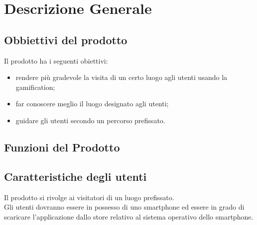 \section{Descrizione Generale}
\label{sec:DescrizioneGenerale}

	\subsection{Obbiettivi del prodotto}
	\label{sec:ObbiettiviDelProdotto}
		Il prodotto ha i seguenti obiettivi:
		\begin{itemize}
			\item rendere più gradevole la visita di un certo luogo agli utenti usando la gamification;
			\item far conoscere meglio il luogo designato agli utenti;
			\item guidare gli utenti secondo un percorso prefissato.
		\end{itemize}
	
	\subsection{Funzioni del Prodotto}
	\label{sub:Funzioni del Prodotto}
		
	
	\subsection{Caratteristiche degli utenti}
	\label{sub:Caratteristiche degli utenti}
		Il prodotto si rivolge ai visitatori di un luogo prefissato. \\
		Gli utenti dovranno essere in possesso di uno smartphone ed essere in grado di scaricare l'applicazione dallo store relativo al sistema operativo dello smartphone. 